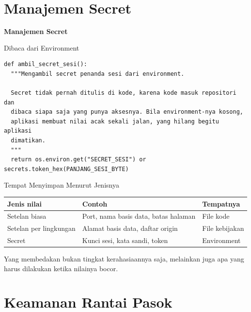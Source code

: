 \documentclass[aspectratio=169, table, 12pt]{beamer}
\begin{document}
\section{Manajemen Secret}

\begin{frame}{\hfill}
  \centering
  \Huge{\textbf{Manajemen Secret}}
\end{frame}

\begin{frame}[fragile]{{\Large Dibaca dari Environment}}
  \vspace{2pt}
\begin{lstlisting}[style=PythonStyle]
def ambil_secret_sesi():
  """Mengambil secret penanda sesi dari environment.

  Secret tidak pernah ditulis di kode, karena kode masuk repositori dan
  dibaca siapa saja yang punya aksesnya. Bila environment-nya kosong,
  aplikasi membuat nilai acak sekali jalan, yang hilang begitu aplikasi
  dimatikan.
  """
  return os.environ.get("SECRET_SESI") or secrets.token_hex(PANJANG_SESI_BYTE)
\end{lstlisting}
\end{frame}

\begin{frame}{{\Large Tempat Menyimpan Menurut Jenisnya}}
  \vspace{6pt}
  \centering
  {\footnotesize
  \begin{tabularx}{\textwidth}{lYl}
    \hline
    \textbf{Jenis nilai} & \textbf{Contoh} & \textbf{Tempatnya} \\
    \hline
    Setelan biasa & Port, nama basis data, batas halaman & File kode \\
    \hline
    Setelan per lingkungan & Alamat basis data, daftar origin & File kebijakan \\
    \hline
    Secret & Kunci sesi, kata sandi, token & Environment \\
    \hline
  \end{tabularx}}

  \vspace{8pt}
  {\small Yang membedakan bukan tingkat kerahasiaannya saja, melainkan juga
  apa yang harus dilakukan ketika nilainya bocor.}
\end{frame}

\section{Keamanan Rantai Pasok}
\end{document}
